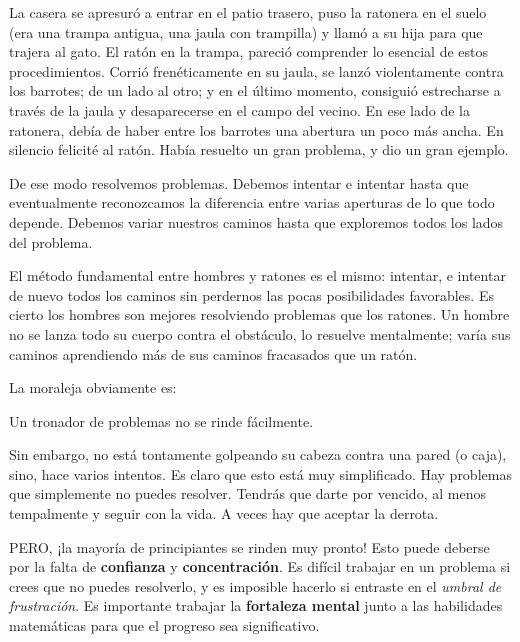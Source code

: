 \begin{adjustwidth}{2cm}{}
    La casera se apresuró a entrar en el patio trasero, 
    puso la ratonera en el suelo (era una trampa antigua, 
    una jaula con trampilla) y llamó a su hija para que trajera al gato. 
    El ratón en la trampa, pareció comprender lo esencial de 
    estos procedimientos. Corrió frenéticamente en su jaula,
    se lanzó violentamente contra los barrotes; de un lado al otro; 
    y en el último momento, consiguió estrecharse a través de la jaula
    y desaparecerse en el campo del vecino. En ese lado de la ratonera, 
    debía de haber entre los barrotes una abertura un poco más ancha.
    En silencio felicité al ratón. Había resuelto un gran
    problema, y dio un gran ejemplo.

    De ese modo resolvemos problemas. Debemos intentar e intentar hasta que 
    eventualmente reconozcamos la diferencia entre varias aperturas 
    de lo que todo depende. Debemos variar nuestros caminos hasta que 
    exploremos todos los lados del problema. 

    El método fundamental entre hombres y ratones es el mismo: intentar, 
    e intentar de nuevo todos los caminos sin perdernos las pocas posibilidades 
    favorables. Es cierto los hombres son mejores resolviendo problemas que 
    los ratones. Un hombre no se lanza todo su cuerpo contra el obstáculo, 
    lo resuelve mentalmente; varía sus caminos aprendiendo más de sus 
    caminos fracasados que un ratón.
\end{adjustwidth}

La moraleja obviamente es: 

\begin{moral}
    Un tronador de problemas no se rinde fácilmente. 
\end{moral}

Sin embargo, no está tontamente golpeando su cabeza contra una pared 
(o caja), sino, hace varios intentos. Es claro que esto está muy 
simplificado.  Hay problemas que simplemente no puedes resolver. 
Tendrás que darte por vencido, al menos tempalmente y seguir con la vida. 
A veces hay que aceptar la derrota.

PERO, ¡la mayoría de principiantes se rinden muy pronto! 
Esto puede deberse por la falta de \textbf{confianza} y \textbf{concentración}. 
Es difícil trabajar en un problema si crees que no puedes resolverlo, y 
es imposible hacerlo si entraste en el \textit{umbral de frustración}. 
Es importante trabajar la \textbf{fortaleza mental} junto a las habilidades 
matemáticas para que el progreso sea significativo.

